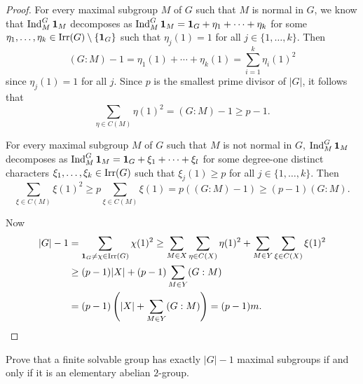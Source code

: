 \begin{proof}
   For every maximal subgroup $M$ of $G$ such that $M$ is normal in $G$, 
   we know that $\operatorname{Ind}_M^G\mathbf{1}_M$ decomposes 
   as $\operatorname{Ind}_M^G\mathbf{1}_M=\mathbf{1}_G+\eta_1+\cdots+\eta_k$ for some  
   $\eta_1,\dots,\eta_k\in\operatorname{Irr}(G)\setminus\{\mathbf{1}_G\}$ such that 
   $\eta_j(1)=1$ for all $j\in\{1,\dots,k\}$. Then
   \[
   (G:M)-1=\eta_1(1)+\cdots+\eta_k(1)=\sum_{i=1}^k\eta_i(1)^2
   \]
   since $\eta_j(1)=1$ for all $j$. Since $p$ is the smallest prime divisor of $|G|$, 
   it follows that 
   \[
   \sum_{\eta\in C(M)}\eta(1)^2
   =(G:M)-1\geq p-1.
   \]

   For every maximal subgroup $M$ of $G$ such that $M$ is not normal in $G$, 
   $\operatorname{Ind}_M^G\mathbf{1}_M$ decomposes 
   as $\operatorname{Ind}_M^G\mathbf{1}_M=\mathbf{1}_G+\xi_1+\cdots+\xi_l$ for some degree-one distinct characters 
   $\xi_1,\dots,\xi_k\in\operatorname{Irr}(G)$ such that $\xi_j(1)\geq p$ for all $j\in\{1,\dots,k\}$. 
   Then 
   \[
   \sum_{\xi\in C(M)}\xi(1)^2
   \geq p\sum_{\xi\in C(M)}\xi(1)
   =p((G:M)-1)
   \geq (p-1)(G:M).
   \]

   Now 
   \begin{align*}
    |G|-1 &=\sum_{\mathbf{1}_G\ne\chi\in\operatorname{Irr}(G)}\chi(1)^2
    \geq\sum_{M\in X}\sum_{\eta\in C(X)}\eta(1)^2
    +\sum_{M\in Y}\sum_{\xi\in C(X)}\xi(1)^2\\
    &\geq (p-1)|X|+(p-1)\sum_{M\in Y}(G:M)\\
    &=(p-1)\left(|X|+\sum_{M\in Y}(G:M)\right)=(p-1)m.\qedhere 
   \end{align*}
\end{proof}

\begin{exercise}
    Prove that a finite solvable group has exactly $|G|-1$ maximal subgroups
    if and only if it is an elementary abelian $2$-group. 
\end{exercise}

